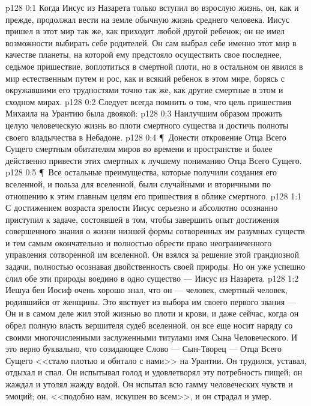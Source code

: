 \vs p128 0:1 Когда Иисус из Назарета только вступил во взрослую жизнь, он, как и прежде, продолжал вести на земле обычную жизнь среднего человека. Иисус пришел в этот мир так же, как приходит любой другой ребенок; он не имел возможности выбирать себе родителей. Он сам выбрал себе именно этот мир в качестве планеты, на которой ему предстояло осуществить свое последнее, седьмое пришествие, воплотиться в смертной плоти, но в остальном он явился в мир естественным путем и рос, как и всякий ребенок в этом мире, борясь с окружавшими его трудностями точно так же, как другие смертные в этом и сходном мирах.
\vs p128 0:2 Следует всегда помнить о том, что цель пришествия Михаила на Урантию была двоякой:
\vs p128 0:3 \bibnobreakspace Наилучшим образом прожить целую человеческую жизнь во плоти смертного существа и достичь полноты своего владычества в Небадоне.
\vs p128 0:4 \P\ \bibnobreakspace Донести откровение Отца Всего Сущего смертным обитателям миров во времени и пространстве и более действенно привести этих смертных к лучшему пониманию Отца Всего Сущего.
\vs p128 0:5 \P\ Все остальные преимущества, которые получили создания его вселенной, и польза для вселенной, были случайными и вторичными по отношению к этим главным целям его пришествия в облике смертного.
\vs p128 1:1 С достижением возраста зрелости Иисус серьезно и абсолютно осознанно приступил к задаче, состоявшей в том, чтобы завершить опыт достижения совершенного знания о жизни низшей формы сотворенных им разумных существ и тем самым окончательно и полностью обрести право неограниченного управления сотворенной им вселенной. Он взялся за решение этой грандиозной задачи, полностью осознавая двойственность своей природы. Но он уже успешно слил обе эти природы воедино в одно существо --- Иисус из Назарета.
\vs p128 1:2 Иешуа бен Иосиф очень хорошо знал, что он --- человек, смертный человек, родившийся от женщины. Это явствует из выбора им своего первого звания ---  Он и в самом деле жил этой жизнью во плоти и крови, и даже сейчас, когда он обрел полную власть вершителя судеб вселенной, он все еще носит наряду со своими многочисленными заслуженными титулами имя Сына Человеческого. И это верно буквально, что созидающее Слово --- Сын\hyp{}Творец --- Отца Всего Сущего <<стало плотью и обитало с нами>> на Урантии. Он трудился, уставал, отдыхал и спал. Он испытывал голод и удовлетворял эту потребность пищей; он жаждал и утолял жажду водой. Он испытал всю гамму человеческих чувств и эмоций; он, <<подобно нам, искушен во всем>>, и он страдал и умер.
